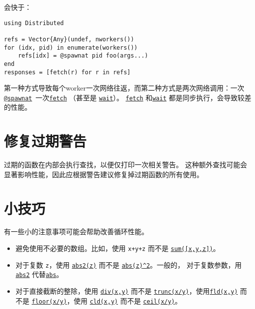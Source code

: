 会快于：




\begin{verbatim}
using Distributed

refs = Vector{Any}(undef, nworkers())
for (idx, pid) in enumerate(workers())
    refs[idx] = @spawnat pid foo(args...)
end
responses = [fetch(r) for r in refs]
\end{verbatim}



第一种方式导致每个worker一次网络往返，而第二种方式是两次网络调用：一次 \hyperlink{11231712027010946923}{\texttt{@spawnat}} 一次\hyperlink{11007884648860062495}{\texttt{fetch}} （甚至是 \hyperlink{13761789780433862250}{\texttt{wait}}）。 \hyperlink{11007884648860062495}{\texttt{fetch}} 和\hyperlink{13761789780433862250}{\texttt{wait}} 都是同步执行，会导致较差的性能。



\hypertarget{1574945516556538959}{}


\section{修复过期警告}



过期的函数在内部会执行查找，以便仅打印一次相关警告。 这种额外查找可能会显著影响性能，因此应根据警告建议修复掉过期函数的所有使用。



\hypertarget{3670078412083548982}{}


\section{小技巧}



有一些小的注意事项可能会帮助改善循环性能。



\begin{itemize}
\item 避免使用不必要的数组。比如，使用 \texttt{x+y+z} 而不是 \hyperlink{8666686648688281595}{\texttt{sum([x,y,z])}}。


\item 对于复数 \texttt{z}，使用 \hyperlink{15686257922156163743}{\texttt{abs2(z)}} 而不是 \hyperlink{462277561264792021}{\texttt{abs(z){\textasciicircum}2}}。一般的， 对于复数参数，用 \hyperlink{15686257922156163743}{\texttt{abs2}} 代替\hyperlink{9614495866226399167}{\texttt{abs}}。


\item 对于直接截断的整除，使用 \hyperlink{8020976424566491334}{\texttt{div(x,y)}} 而不是 \hyperlink{1728363361565303194}{\texttt{trunc(x/y)}}，使用\hyperlink{15067916827074788527}{\texttt{fld(x,y)}} 而不是 \hyperlink{11115257331910840693}{\texttt{floor(x/y)}}，使用 \hyperlink{7922388465305816555}{\texttt{cld(x,y)}} 而不是 \hyperlink{10519509038312853061}{\texttt{ceil(x/y)}}。

\end{itemize}


